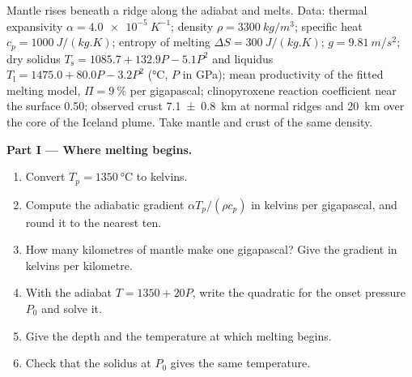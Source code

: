 \begin{problem}
\label{pb:b2:mantle-melting:1}
Mantle rises beneath a ridge along the adiabat and melts. Data: thermal
expansivity $\alpha = \qty{4.0e-5}{K^{-1}}$; density $\rho = \qty{3300}{kg/m^3}$;
specific heat $c_p = \qty{1000}{J/(kg.K)}$; entropy of melting $\Delta S =
\qty{300}{J/(kg.K)}$; $g = \qty{9.81}{m/s^2}$; dry solidus $T_{\mathrm s} =
1085.7 + 132.9P - 5.1P^2$ and  liquidus $T_{\mathrm l} = 1475.0 +
80.0P - 3.2P^2$ (\unit{\celsius}, $P$ in \unit{GPa}); mean productivity of the
fitted melting model, $\Pi = \qty{9}{\percent}$ per gigapascal; clinopyroxene
reaction coefficient near the surface 0.50; observed crust \qty[uncertainty-mode=separate]{7.1 \pm 0.8}{km}
at normal ridges and \qty{20}{km} over the core of the Iceland plume. Take mantle
and crust of the same density.

\noindent\textbf{Part I --- Where melting begins.}
\begin{enumerate}
\item Convert $T_p = \qty{1350}{\celsius}$ to kelvins.
\item Compute the adiabatic gradient $\alpha T_p/(\rho c_p)$ in kelvins per
gigapascal, and round it to the nearest ten.
\item How many kilometres of mantle make one gigapascal? Give the gradient in
kelvins per kilometre.
\item With the adiabat $T = 1350 + 20P$, write the quadratic for the onset pressure
$P_0$ and solve it.
\item Give the depth and the temperature at which melting begins.
\item Check that the solidus at $P_0$ gives the same temperature.
\end{enumerate}


\end{problem}
